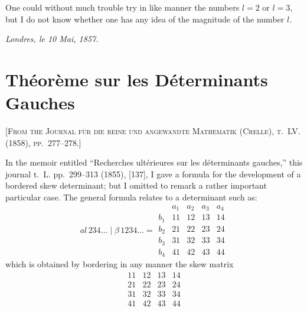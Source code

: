 \documentclass[11pt,a4paper]{article}
\begin{document}
One could without much trouble try in like manner the numbers $l=2$ or $l=3$, but I do not know whether one has any idea of the magnitude of the number $l$.

\medskip
\noindent\textit{Londres, le 10 Mai, 1857.}

\newpage


\section{Théorème sur les Déterminants Gauches}

\textsc{[From the Journal für die reine und angewandte Mathematik (Crelle), t.~LV. (1858), pp.~277--278.]}
\label{paper:237}

\setcounter{page}{73}

In the memoir entitled ``Recherches ultérieures sur les déterminants gauches,'' this journal t.~L. pp.~299--313 (1855), [137], I gave a formula for the development of a bordered skew determinant; but I omitted to remark a rather important particular case. The general formula relates to a determinant such as:
\[
\renewcommand{\arraystretch}{1.2}
a\!\!\textit{l}\,234\ldots \mid \beta\,1234\ldots =
\begin{array}{c|cccc}
& a_1 & a_2 & a_3 & a_4 \\
\hline
b_1 & 11 & 12 & 13 & 14 \\
b_2 & 21 & 22 & 23 & 24 \\
b_3 & 31 & 32 & 33 & 34 \\
b_4 & 41 & 42 & 43 & 44
\end{array}
\]
which is obtained by bordering in any manner the skew matrix
\[
\begin{array}{cccc}
11 & 12 & 13 & 14 \\
21 & 22 & 23 & 24 \\
31 & 32 & 33 & 34 \\
41 & 42 & 43 & 44
\end{array}
\]

\setcounter{page}{74}
\end{document}

